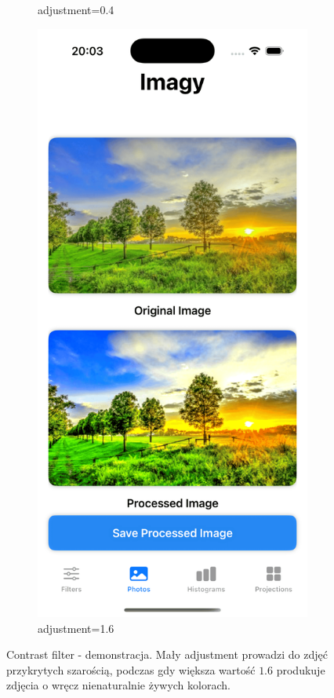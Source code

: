 \documentclass[a4paper]{article}
\begin{document}
\begin{figure}[H]
\begin{subfigure}{0.2\textwidth}
        \caption{adjustment=0.4}
        \label{fig:trees_contrast_0}
    \end{subfigure}
    \hfill
    \begin{subfigure}{0.2\textwidth}
        \centering
        \includegraphics[width=\linewidth]{images/trees_contrast_1.6.png}
        \caption{adjustment=1.6}
        \label{fig:trees_contrast_1}
    \end{subfigure}
    \caption{Contrast filter - demonstracja. Mały adjustment prowadzi do zdjęć przykrytych szarością, podczas gdy większa wartość $1.6$ produkuje zdjęcia o wręcz nienaturalnie żywych kolorach.}
    \label{fig:contrast}
\end{figure}
\end{document}
